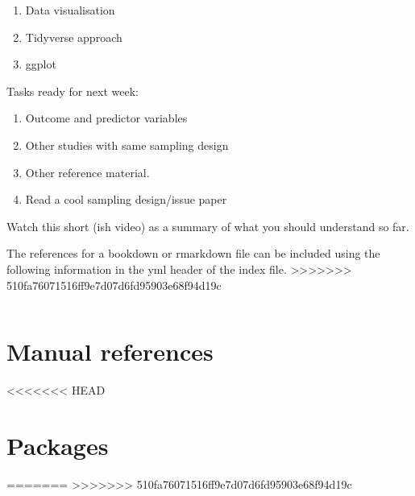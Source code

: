 \documentclass[
]{book}
\begin{document}
\begin{enumerate}
\def\labelenumi{\arabic{enumi}.}
\setcounter{enumi}{3}
\item
  Data visualisation
\item
  Tidyverse approach
\item
  ggplot
\end{enumerate}

Tasks ready for next week:

\begin{enumerate}
\def\labelenumi{\arabic{enumi}.}
\item
  Outcome and predictor variables
\item
  Other studies with same sampling design
\item
  Other reference material.
\item
  Read a cool sampling design/issue paper
\end{enumerate}

Watch this short (ish video) as a summary of what you should understand so far.

The references for a bookdown or rmarkdown file can be included using the following information in the yml header of the index file.
>>>>>>> 510fa76071516ff9e7d07d6fd95903e68f94d19c

\begin{verbatim}
\end{verbatim}

\hypertarget{manual-references}{%
\section{Manual references}\label{manual-references}}
<<<<<<< HEAD

\hypertarget{packages}{%
\section{Packages}\label{packages}}
=======
>>>>>>> 510fa76071516ff9e7d07d6fd95903e68f94d19c

  
\end{document}
